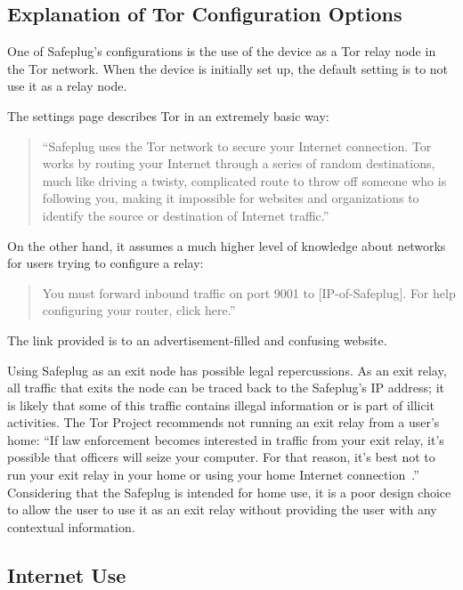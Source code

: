 \documentclass[letterpaper,twocolumn,10pt]{article}
\begin{document}
\subsection{Explanation of Tor Configuration Options}
\label{port9001}
One of Safeplug's configurations is the use of the device as a Tor relay node in the Tor network.  When the device is initially set up, the default setting is to not use it as a relay node.  

The settings page describes Tor in an extremely basic way:

\begin{quotation}
``Safeplug uses the Tor network to secure your Internet connection.  Tor works by routing your Internet through a series of random destinations, much like driving a twisty, complicated route to throw off someone who is following you, making it impossible for websites and organizations to identify the source or destination of Internet traffic.''
\end{quotation}

On the other hand, it assumes a much higher level of knowledge about networks for users trying to configure a relay:
\begin{quotation}
You must forward inbound traffic on port 9001 to [IP-of-Safeplug]. For help configuring your router, click here.''
\end{quotation}

The link provided is to an advertisement-filled and confusing website.

Using Safeplug as an exit node has possible legal repercussions.  As an exit relay, all traffic that exits the node can be traced back to the Safeplug's IP address; it is likely that some of this traffic contains illegal information or is part of illicit activities.  The Tor Project recommends not running an exit relay from a user's home: ``If law enforcement becomes interested in traffic from your exit relay, it's possible that officers will seize your computer. For that reason, it's best not to run your exit relay in your home or using your home Internet connection~\cite{law}.''  Considering that the Safeplug is intended for home use, it is a poor design choice to allow the user to use it as an exit relay without providing the user with any contextual information.

\subsection{Internet Use}
\label{inetuse}
\end{document}
